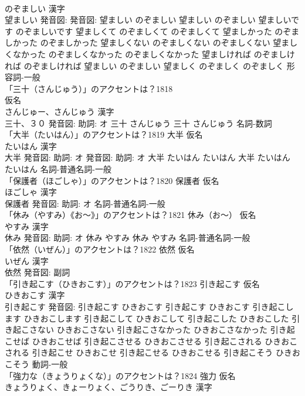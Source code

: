 \documentclass[8pt]{extreport}
\begin{document}
\begin{CJK}{UTF8}{min}
\\	のぞましい 漢字　
\\	望ましい 発音図: 発音図:	望ましい のぞましい		望ましい のぞましい 望ましいです のぞましいです 望ましくて のぞましくて のぞましくて 望ましかった のぞましかった のぞましかった 望ましくない のぞましくない のぞましくない 望ましくなかった のぞましくなかった のぞましくなかった 望ましければ のぞましければ のぞましければ 望ましい のぞましい 望ましく のぞましく のぞましく				形容詞-一般 
\\	「三十（さんじゅう）」のアクセントは？1818	
\\	仮名　
\\	さんじゅー、さんじゅう 漢字　
\\	三十、３０ 発音図: 助詞: オ	三十 さんじゅう		三十 さんじゅう				名詞-数詞 
\\	「大半（たいはん）」のアクセントは？1819	大半 仮名　
\\	たいはん 漢字　
\\	大半 発音図: 助詞: オ 発音図: 助詞: オ	大半 たいはん たいはん		大半 たいはん たいはん				名詞-普通名詞-一般 
\\	「保護者（ほごしゃ）」のアクセントは？1820	保護者 仮名　
\\	ほごしゃ 漢字　
\\	保護者 発音図: 助詞: オ							名詞-普通名詞-一般 
\\	「休み（やすみ）《お〜》」のアクセントは？1821	休み（お〜） 仮名　
\\	やすみ 漢字　
\\	休み 発音図: 助詞: オ	休み やすみ		休み やすみ				名詞-普通名詞-一般 
\\	「依然（いぜん）」のアクセントは？1822	依然 仮名　
\\	いぜん 漢字　
\\	依然 発音図:							副詞 
\\	「引き起こす（ひきおこす）」のアクセントは？1823	引き起こす 仮名　
\\	ひきおこす 漢字　
\\	引き起こす 発音図:	引き起こす ひきおこす		引き起こす ひきおこす 引き起こします ひきおこします 引き起こして ひきおこして 引き起こした ひきおこした 引き起こさない ひきおこさない 引き起こさなかった ひきおこさなかった 引き起こせば ひきおこせば 引き起こさせる ひきおこさせる 引き起こされる ひきおこされる 引き起こせ ひきおこせ 引き起こせる ひきおこせる 引き起こそう ひきおこそう				動詞-一般 
\\	「強力な（きょうりょくな）」のアクセントは？1824	強力 仮名　
\\	きょうりょく、きょーりょく、ごうりき、ごーりき 漢字　

\end{CJK}
\end{document}
